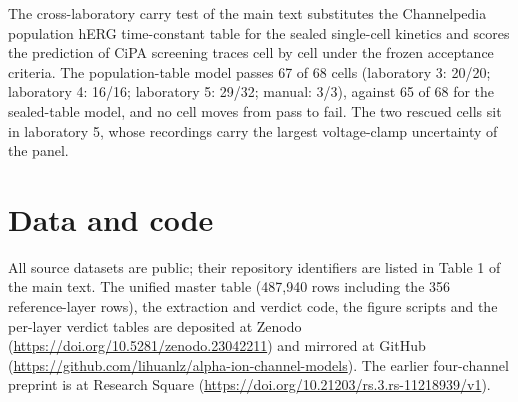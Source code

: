 \documentclass[11pt,a4paper]{article}
\begin{document}
The cross-laboratory carry test of the main text substitutes the Channelpedia
population hERG time-constant table for the sealed single-cell kinetics and
scores the prediction of CiPA screening traces cell by cell under the frozen
acceptance criteria. The population-table model passes 67 of 68 cells
(laboratory 3: 20/20; laboratory 4: 16/16; laboratory 5: 29/32; manual: 3/3),
against 65 of 68 for the sealed-table model, and no cell moves from pass to
fail. The two rescued cells sit in laboratory 5, whose recordings carry the
largest voltage-clamp uncertainty of the panel.

\FloatBarrier
\section{Data and code}

All source datasets are public; their repository identifiers are listed in
Table 1 of the main text. The unified master table (487,940 rows including the
356 reference-layer rows), the extraction and verdict code, the figure scripts
and the per-layer verdict tables are deposited at Zenodo
(\url{https://doi.org/10.5281/zenodo.23042211}) and mirrored at GitHub
(\url{https://github.com/lihuanlz/alpha-ion-channel-models}). The earlier
four-channel preprint is at Research Square
(\url{https://doi.org/10.21203/rs.3.rs-11218939/v1}).
\end{document}
